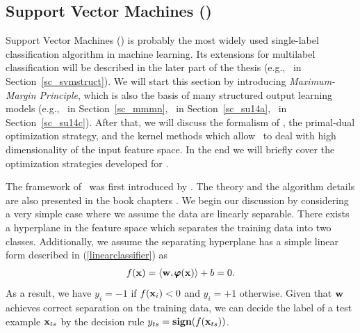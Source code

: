 {\iffalse
The key is to introduce a set of tighter upper bounds on (\ref{lr_posteriori_log}) that are parameterized by $\valpha$.
The bounds should have a simple form such that the maximizing (\ref{lr_posteriori_log}) over $\vw$ can be solved analytically with $\alpha$.
The solution to the original problem is transferred as finding the tighter upper bounds for  $\vw$, which is to minimize with respect to $\alpha$.

Later on, optimization algorithms that are based on dual form have been developed, for example iterative optimization method \citep{Keerthi05a} and the dual coordinate descent method \citep{Yu11dual}.
\fi


%
% 
\subsection{Support Vector Machines (\svm)}	\label{sc_svm}

Support Vector Machines (\svm) is probably the most widely used single-label classification algorithm in machine learning.
Its extensions for multilabel classification will be described in the later part of the thesis (e.g., \svmstruct\ in Section~\ref{sc_svmstruct}).
We will start this section by introducing \textit{Maximum-Margin Principle}, which is also the basis of many structured output learning models (e.g., \mmmn\ in Section~\ref{sc_mmmn}, \spin\ in Section~\ref{sc_su14a}, \rta\ in Section~\ref{sc_su14c}).
After that, we will discuss the formalism of \svm, the primal-dual optimization strategy, and the kernel methods which allow \svm\ to deal with high dimensionality of the input feature space.
In the end we will briefly cover the optimization strategies developed for \svm.

The framework of \svm\ was first introduced by \citep{Cortes95support}.
The theory and the algorithm details are also presented in the book chapters \citep{Scholkopf02learning,taylor04,Bishop07}.
We begin our discussion by considering a very simple case where we assume the data are linearly separable.
There exists a hyperplane in the feature space which separates the training data into two classes.
Additionally, we assume the {separating hyperplane} has a simple linear form described in (\ref{linearclassifier}) as
\begin{align*}
	f(\mathbf {x})=\langle \mathbf {w}, \pmb \varphi(\mathbf {x}) \rangle + b = 0.
\end{align*}
As a result, we have $y_i=-1$ if $f(\mathbf {x}_i)<0$ and $y_i=+1$ otherwise.
Given that $\vw$ achieves correct separation on the training data, we can decide the label of a test example $\mathbf {x}_{ts}$ by the decision rule $y_{ts}=\textbf{sign}(f(\mathbf {x}_{ts}))$.

}
